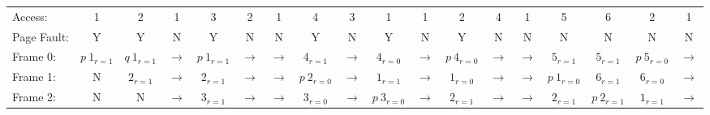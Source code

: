 \documentclass{report}
\begin{document}
            \begin{tiny}
                \begin{center}
                    \begin{tabular}{l c c c c c c c c c c c c c c c c c}
                        Access:     &             1 &             2 & 1 &             3 & 2 & 1 &             4 & 3 &             1 & 1 &             2 & 4 & 1 &             5 &             6 &             2 & 1 \\
                        Page Fault: &             Y &             Y & N &             Y & N & N &             Y & N &             Y & N &             Y & N & N &             N &             N &             N & N\\
                        Frame 0:    & $p \ 1_{r=1}$ & $q \ 1_{r=1}$ & $\to$ & $p \ 1_{r=1}$ & $\to$ & $\to$ &     $4_{r=1}$ & $\to$ & $4_{r=0}$     & $\to$ & $p \ 4_{r=0}$ & $\to$ & $\to$ &     $5_{r=1}$ &     $5_{r=1}$ & $p \ 5_{r=0}$ & $\to$\\
                        Frame 1:    & N             & $2_{r=1}$     & $\to$ & $2_{r=1}$     & $\to$ & $\to$ & $p \ 2_{r=0}$ & $\to$ & $1_{r=1}$     & $\to$ & $1_{r=0}$     & $\to$ & $\to$ & $p \ 1_{r=0}$ &     $6_{r=1}$ &     $6_{r=0}$ & $\to$\\
                        Frame 2:    & N             & N             & $\to$ & $3_{r=1}$     & $\to$ & $\to$ &     $3_{r=0}$ & $\to$ & $p \ 3_{r=0}$ & $\to$ & $2_{r=1}$     & $\to$ & $\to$ &     $2_{r=1}$ & $p \ 2_{r=1}$ &     $1_{r=1}$ & $\to$\\
                    \end{tabular}
                \end{center}
            \end{tiny}
\end{document}
